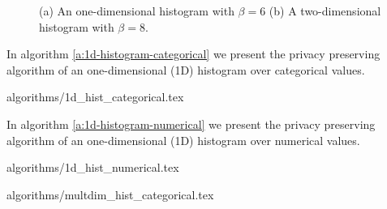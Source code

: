 \begin{figure}[H]
    \centering

    \caption{(a) An one-dimensional histogram with $\beta = 6$
    (b) A two-dimensional histogram with $\beta = 8$.}
    \label{f:simple-hist}
\end{figure}







In algorithm \ref{a:1d-histogram-categorical} we present the privacy preserving algorithm of an one-dimensional (1D) histogram over categorical values.

{algorithms/1d_hist_categorical.tex}




In algorithm \ref{a:1d-histogram-numerical} we present the privacy preserving algorithm of an one-dimensional (1D) histogram over numerical values.

{algorithms/1d_hist_numerical.tex}




{algorithms/multdim_hist_categorical.tex}

